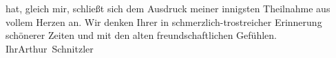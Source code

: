 \begin{ledgroupsized}[t]{13cm}
                    hat, gleich mir, schließt sich dem Ausdruck meiner innigsten Theilnahme aus
                    vollem Herzen an. Wir denken Ihrer in schmerzlich-trostreicher Erinnerung
                    schönerer Zeiten und mit den alten freundschaftlichen Gefühlen.\pend
           \pstart Ihr\spacefill\mbox{Arthur Schnitzler}\pend{}\endnumbering{}\end{ledgroupsized}  \newcommand{\dateiname}{L02337}\newcommand{\titel}{Arthur Schnitzler an Ida Dehmel, 25. 2. 1920}\newcommand{\editorInnen}{ Martin Anton Müller und Gerd-Hermann Susen}
      